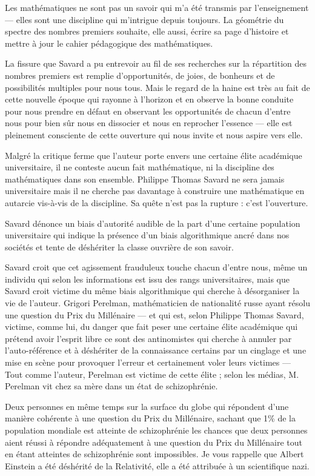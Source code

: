 \documentclass[11pt,a4paper]{article}
\begin{document}
Les mathématiques ne sont pas un savoir qui m'a été transmis par l'enseignement --- elles sont une discipline qui m'intrigue depuis toujours. La géométrie du spectre des nombres premiers souhaite, elle aussi, écrire sa page d'histoire et mettre à jour le cahier pédagogique des mathématiques.

La fissure que Savard a pu entrevoir au fil de ses recherches sur la répartition des nombres premiers est remplie d'opportunités, de joies, de bonheurs et de possibilités multiples pour nous tous. Mais le regard de la haine est très au fait de cette nouvelle époque qui rayonne à l'horizon et en observe la bonne conduite pour nous prendre en défaut en observant les opportunités de chacun d'entre nous pour bien sûr nous en dissocier et nous en reprocher l'essence --- elle est pleinement consciente de cette ouverture qui nous invite et nous aspire vers elle.

Malgré la critique ferme que l'auteur porte envers une certaine élite académique universitaire, il ne conteste aucun fait mathématique, ni la discipline des mathématiques dans son ensemble. Philippe Thomas Savard ne sera jamais universitaire mais il ne cherche pas davantage à construire une mathématique en autarcie vis-à-vis de la discipline. Sa quête n'est pas la rupture : c'est l'ouverture.

Savard dénonce un biais d'autorité audible de la part d'une certaine population universitaire qui indique la présence d'un biais algorithmique ancré dans nos sociétés et tente de déshériter la classe ouvrière de son savoir.

Savard croit que cet agissement frauduleux touche chacun d'entre nous, même un individu qui selon les informations est issu des rangs universitaires, mais que Savard croit victime du même biais algorithmique qui cherche à désorganiser la vie de l'auteur. Grigori Perelman, mathématicien de nationalité russe ayant résolu une question du Prix du Millénaire --- et qui est, selon Philippe Thomas Savard, victime, comme lui, du danger que fait peser une certaine élite académique qui prétend avoir l'esprit libre ce sont des antinomistes qui cherche à annuler par l'auto-référence et à déshériter de la connaissance certains par un cinglage et une mise en scène pour provoquer l'erreur et certainement voler leurs victimes --- Tout comme l'auteur, Perelman est victime de cette élite ; selon les médias, M. Perelman vit chez sa mère dans un état de schizophrénie.

Deux personnes en même temps sur la surface du globe qui répondent d'une manière cohérente à une question du Prix du Millénaire, sachant que 1\% de la population mondiale est atteinte de schizophrénie les chances que deux personnes aient réussi à répondre adéquatement à une question du Prix du Millénaire tout en étant atteintes de schizophrénie sont impossibles. Je vous rappelle que Albert Einstein a été déshérité de la Relativité, elle a été attribuée à un scientifique nazi.
\end{document}
